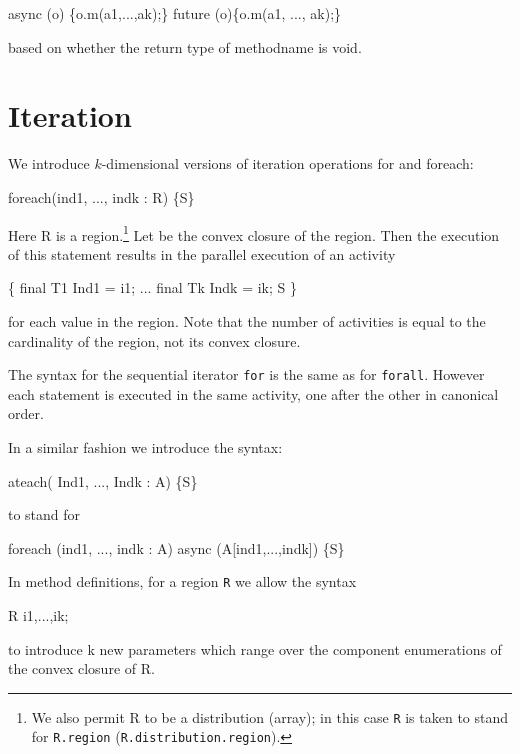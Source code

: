\begin{x10}
 async (o) \{o.m(a1,...,ak);\}
 future (o)\{o.m(a1, ..., ak);\}
\end{x10}
\noindent based on whether the return type of methodname is {\cf void}.

\section{Iteration}\label{ForLoop}
\label{ForAllLoop}

We introduce  $k$-dimensional versions of iteration operations {\cf for} and 
{\cf foreach}:

\begin{x10}
   foreach(ind1, ..., indk : R) \{S\}
\end{x10}

Here {\cf R} is a region.\footnote{We also permit {\cf R} to be a distribution (array); in this case {\tt R} is taken to stand for {\tt R.region} ({\tt R.distribution.region}).}  Let {\cf [T1,...,
Tk]} be the convex closure of the region.  Then the execution of this
statement results in the parallel execution of an activity

\begin{x10}
   \{ final T1 Ind1 = i1; 
     ...
     final Tk Indk = ik;
     S
   \}
\end{x10}
\noindent for each value {\cf [i1,\ldots, ik]} in the region. Note that
the number of activities is equal to the cardinality of the region,
not its convex closure. 

The syntax for the sequential iterator {\tt for} is the same as for
{\tt forall}. However each statement is executed in the same activity,
one after the other in canonical order.

In a similar fashion we introduce the syntax:

\begin{x10}
   ateach( Ind1, ..., Indk : A) \{S\}
\end{x10}

\noindent to stand for
\begin{x10}
   foreach (ind1, ..., indk : A) 
    async (A[ind1,...,indk]) \{S\}
\end{x10}

In method definitions, for a region {\tt R} we allow the syntax 
\begin{x10}
     R i1,...,ik; 
\end{x10} 

\noindent to introduce {\cf k} new parameters which range over the
component enumerations of the convex closure of {\cf R}.

 \par  %



